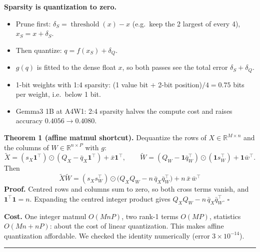 \documentclass[11pt]{article}
\newcommand{\R}{\mathbb{R}}
\newcommand{\one}{\mathbf 1}
\newcommand{\slide}[1]{\clearpage\noindent{\Large\bfseries #1}\par\vspace{4pt}\hrule\vspace{10pt}}
\begin{document}
\begin{minipage}[t]{0.44\textwidth}
\textbf{Sparsity is quantization to zero.}
\begin{itemize}
\item Prune first: $\delta_S=\operatorname{threshold}(x)-x$ (e.g.\ keep the 2 largest of every 4), $x_S=x+\delta_S$.
\item Then quantize: $q=f(x_S)+\delta_Q$.
\item $g(q)$ is fitted to the dense float $x$, so both passes see the total error $\delta_S+\delta_Q$.
\item 1-bit weights with 1:4 sparsity: (1 value bit $+$ 2-bit position)$/4=0.75$ bits per weight, i.e.\ below 1 bit.
\item Gemma3 1B at A4W1: 2:4 sparsity halves the compute cost and raises accuracy $0.4056\to0.4080$.
\end{itemize}
\end{minipage}\hfill
\begin{minipage}[t]{0.52\textwidth}
\textbf{Theorem 1 (affine matmul shortcut).} Dequantize the rows of $X\in\R^{M\times n}$ and the columns of $W\in\R^{n\times P}$ with $g$:
\[
\tilde X=(s_X\one^{\top})\odot(Q_X-\bar q_X\one^{\top})+\bar x\one^{\top},\qquad
\tilde W=(Q_W-\one\bar q_W^{\top})\odot(\one s_W^{\top})+\one\bar w^{\top}.
\]
Then
\[
\boxed{\ \tilde X\tilde W=(s_Xs_W^{\top})\odot\big(Q_XQ_W-n\,\bar q_X\bar q_W^{\top}\big)+n\,\bar x\,\bar w^{\top}\ }
\]
\textbf{Proof.} Centred rows and columns sum to zero, so both cross terms vanish, and $\one^{\top}\one=n$. Expanding the centred integer product gives $Q_XQ_W-n\,\bar q_X\bar q_W^{\top}$. $\square$

\vspace{4pt}
\textbf{Cost.} One integer matmul $O(MnP)$, two rank-1 terms $O(MP)$, statistics $O(Mn+nP)$: about the cost of linear quantization. This makes affine quantization affordable. We checked the identity numerically (error $3\times10^{-14}$).
\end{minipage}

\slide{Results from the paper}
\end{document}
